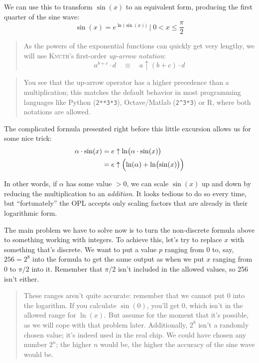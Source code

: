 \documentclass[english]{scrartcl}
\newcommand{\noun}[1]{\textsc{#1}}
\newcommand{\code}[1]{\texttt{#1}}
\newenvironment{details}{
\par\nobreak\noindent%
\begin{quotation}%
  \footnotesize%
  \noindent\Radioactivity%
}{
\end{quotation}
}
\begin{document}
We can use this to transform $\sin(x)$ to an equivalent form, producing the first quarter of the sine wave:
\[ \sin(x) = e^{\ln\bigl(\sin(x)\bigr)} \mid 0<x\leq \frac{\pi}{2} \]

\begin{quotation}
As the powers of the exponential functions can quickly get very lengthy, we will use \noun{Knuth}'s first-order \emph{up-arrow notation}:
\[ a^{b+c} \cdot d  \quad  \equiv  \quad  a \uparrow ( b+c ) \cdot d \]
\end{quotation}
\begin{details}
You see that the up-arrow operator has a higher precedence than a multiplication; this matches the default behavior in most programming languages like Python (\code{2**3*3}), Octave/Matlab (\code{2\^{}3*3}) or R, where both notations are allowed.
\end{details}

The complicated formula presented right before this little excursion allows us for some nice trick:
\begin{align*}
\alpha \cdot \sin(x) & = e \uparrow \ln\bigl(\alpha \cdot \sin(x)\bigr) \\
                     & = e \uparrow \Bigl(\ln(\alpha) + \ln\bigl(\sin(x)\bigr) \Bigr)
\end{align*}

In other words, if $\alpha$ has some value $>0$, we can scale $\sin(x)$ up and down by reducing the multiplication to an \emph{addition}.
It looks tedious to do so every time, but ``fortunately'' the OPL accepts only scaling factors that are already in their logarithmic form.

The main problem we have to solve now is to turn the non-discrete formula above to something working with integers.
To achieve this, let's try to replace $x$ with something that's discrete.
We want to put a value $p$ ranging from 0 to, say, $256=2^8$ into the formula to get the same output as when we put $x$ ranging from 0 to $\pi/2$ into it.
Remember that $\pi/2$ isn't included in the allowed values, so 256 isn't either.

\begin{details}
These ranges aren't quite accurate: remember that we cannot put 0 into the logarithm. 
If you calculate $\sin(0)$, you'll get 0, which isn't in the allowed range for $\ln(x)$.
But assume for the moment that it's possible, as we will cope with that problem later.
Additionally, $2^8$ isn't a randomly chosen value; it's indeed used in the real chip.
We could have chosen any number $2^n$; the higher $n$ would be, the higher the accuracy of the sine wave would be.
\end{details}
\end{document}
